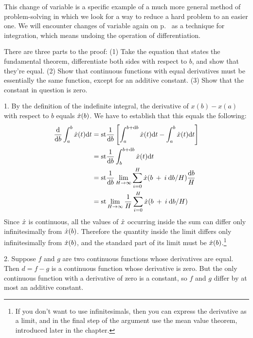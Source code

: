 This change of variable is a specific example of a much more general method of problem-solving in which we look for a way to reduce a hard problem
to an easier one. We will encounter changes of variable again on p.~\pageref{change-of-variable-for-integration} as a technique for
integration, which means undoing the operation of differentiation.


There are three parts to the proof: (1)  Take the equation that states
the fundamental theorem, differentiate both sides with respect to $b$, and show that they're equal.
(2) Show that continuous functions with equal derivatives must be essentially the same function, except for an
additive constant. (3) Show that the constant in question is zero.

1. By the definition of the indefinite integral, the derivative of $x(b)-x(a)$ with respect to $b$ equals
$\dot{x}(b)$. We have to establish that this equals the following:
\begin{align*}
  \frac{\textup{d}}{\textup{d} b} \int_a^b \dot{x}(t) \textup{d} t 
    &= \textup{st} \frac{1}{\textup{d} b}\left[\int_a^{b+\textup{d} b}  \dot{x}(t) \textup{d} t - \int_a^b  \dot{x}(t) \textup{d} t\right] \\
    &= \textup{st} \frac{1}{\textup{d} b}\int_b^{b+\textup{d} b}  \dot{x}(t) \textup{d} t \\
    &= \textup{st} \frac{1}{\textup{d} b}\lim_{H\rightarrow\infty} \sum_{i=0}^H  \dot{x}(b\:+\:i\:\textup{d} b/H) \frac{\textup{d} b}{H} \\
    &= \textup{st} \lim_{H\rightarrow\infty} \frac{1}{H} \sum_{i=0}^H  \dot{x}(b\:+\:i\:\textup{d} b/H)
\end{align*}
Since $\dot{x}$ is continuous, all the values of $\dot{x}$ occurring inside the sum can differ
only infinitesimally from $\dot{x}(b)$. Therefore the quantity inside the limit differs only infinitesimally from
$\dot{x}(b)$, and the standard part of its limit must be $\dot{x}(b)$.\footnote{If you don't want to use infinitesimals,
then you can express the derivative as a limit, and in the final step of the argument use the mean value theorem,
introduced later in the chapter.}

2. Suppose $f$ and $g$ are two continuous functions whose derivatives are equal. Then $d=f-g$ is a continuous function whose derivative is zero.
But the only continuous function with a derivative of zero is a constant, so $f$ and $g$ differ by at most an additive constant.

